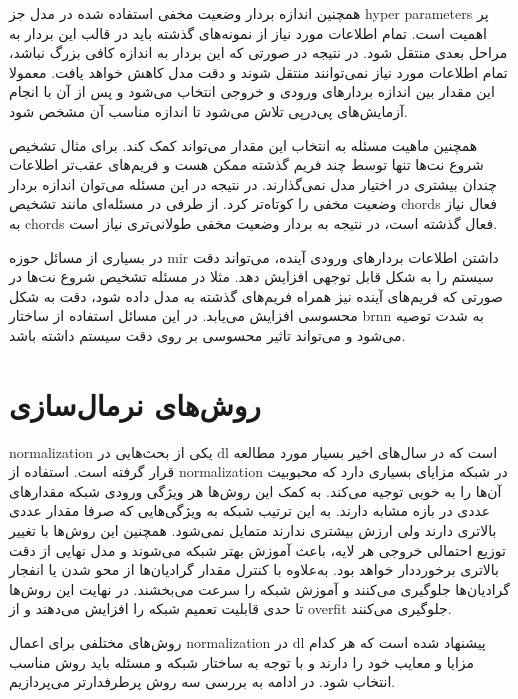 همچنین اندازه بردار وضعیت مخفی استفاده شده در مدل جز \glspl{hyper parameter} پر
اهمیت است. تمام اطلاعات مورد نیاز از نمونه‌های گذشته باید در قالب این بردار
به مراحل بعدی منتقل شود. در نتیجه در صورتی که این بردار به اندازه کافی بزرگ
نباشد، تمام اطلاعات مورد نیاز نمی‌توانند منتقل شوند و دقت مدل کاهش خواهد یافت.
معمولا این مقدار بین اندازه بردارهای ورودی و خروجی انتخاب می‌شود و پس از آن با
انجام آزمایش‌های پی‌در‌پی تلاش می‌شود تا اندازه مناسب آن مشخص شود.

همچنین ماهیت مسئله به انتخاب این مقدار می‌تواند کمک کند. برای مثال تشخیص شروع
نت‌ها تنها توسط چند فریم گذشته ممکن هست و فریم‌های عقب‌تر اطلاعات چندان بیشتری در
اختیار مدل نمی‌گذارند. در نتیجه در این مسئله می‌توان اندازه بردار وضعیت مخفی را
کوتاه‌تر کرد. از طرفی در مسئله‌ای مانند تشخیص \glspl{chord} فعال نیاز به
\glspl{chord} فعال گذشته است، در نتیجه به بردار وضعیت مخفی طولانی‌تری نیاز است.

در بسیاری از مسائل حوزه \gls{mir} داشتن اطلاعات بردارهای ورودی آینده، می‌تواند
دقت سیستم را به شکل قابل توجهی افزایش دهد. مثلا در مسئله تشخیص شروع نت‌ها در
صورتی که فریم‌های آینده نیز همراه فریم‌های گذشته به مدل داده شود، دقت به شکل
محسوسی افزایش می‌یابد. در این مسائل استفاده از ساختار \gls{brnn} به شدت توصیه
می‌شود و می‌تواند تاثیر محسوسی بر روی دقت سیستم داشته باشد.

\section{روش‌های نرمال‌سازی}
\gls{normalization} یکی از بحث‌هایی در \gls{dl} است که در سال‌های اخیر بسیار
مورد مطالعه قرار گرفته است. استفاده از \gls{normalization} در شبکه مزایای بسیاری
دارد که محبوبیت آن‌ها را به خوبی توجیه می‌کند. به کمک این روش‌ها هر ویژگی ورودی
شبکه مقدارهای عددی در بازه مشابه دارند. به این ترتیب شبکه به ویژگی‌هایی که صرفا
مقدار عددی بالاتری دارند ولی ارزش بیشتری ندارند متمایل نمی‌شود. همچنین این
روش‌ها با تغییر توزیع احتمالی خروجی هر لایه، باعث آموزش بهتر شبکه می‌شوند و مدل
نهایی از دقت بالاتری برخورددار خواهد بود. به‌علاوه با کنترل مقدار گرادیان‌ها از
محو شدن یا انفجار گرادیان‌ها جلوگیری می‌کنند و آموزش شبکه را سرعت می‌بخشند. در
نهایت این روش‌ها تا حدی قابلیت تعمیم شبکه را افزایش می‌دهند و از \gls{overfit}
جلوگیری می‌کنند.

روش‌های مختلفی برای اعمال \gls{normalization} در \gls{dl} پیشنهاد شده است که هر
کدام مزایا و معایب خود را دارند و با توجه به ساختار شبکه و مسئله باید روش مناسب
انتخاب شود. در ادامه به بررسی سه روش پرطرفدارتر می‌پردازیم.


